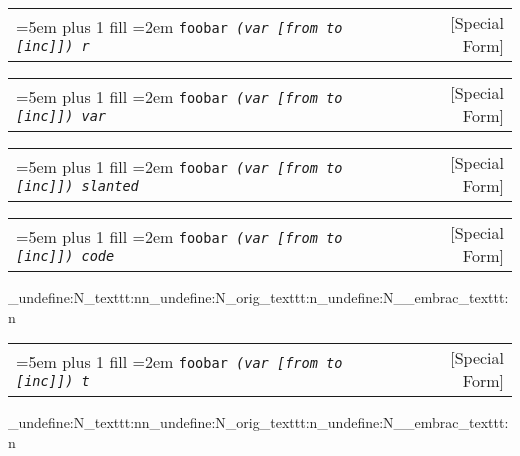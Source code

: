 \documentclass{book}
\newcommand\GNUTexinfocommandstyletextvar[1]{{\normalfont{}\textsl{#1}}}%
\begin{document}
%

\noindent\begin{tabularx}{\linewidth}{@{}Xr}
\rightskip=5em plus 1 fill
\hangindent=2em
\noindent\texttt{foobar \EmbracOn{}\textnormal{\textsl{(var \EmbracOff{}\textnormal{[}\EmbracOn{}from to \EmbracOff{}\textnormal{[}\EmbracOn{}inc\EmbracOff{}\textnormal{]]}\EmbracOn{}) r}}\EmbracOff{}}& [Special Form]
\end{tabularx}

%

\noindent\begin{tabularx}{\linewidth}{@{}Xr}
\rightskip=5em plus 1 fill
\hangindent=2em
\noindent\texttt{foobar \EmbracOn{}\textnormal{\textsl{(var \GNUTexinfocommandstyletextvar{[}from to \GNUTexinfocommandstyletextvar{[}inc\GNUTexinfocommandstyletextvar{]]}) var}}\EmbracOff{}}& [Special Form]
\end{tabularx}

%

\noindent\begin{tabularx}{\linewidth}{@{}Xr}
\rightskip=5em plus 1 fill
\hangindent=2em
\noindent\texttt{foobar \EmbracOn{}\textnormal{\textsl{(var \textsl{[}from to \textsl{[}inc\textsl{]]}) slanted}}\EmbracOff{}}& [Special Form]
\end{tabularx}

%

%
\noindent\begin{tabularx}{\linewidth}{@{}Xr}
\rightskip=5em plus 1 fill
\hangindent=2em
\noindent\texttt{foobar \EmbracOn{}\textnormal{\textsl{(var \texttt{[}from to \texttt{[}inc\texttt{]]}) code}}\EmbracOff{}}& [Special Form]
\end{tabularx}
\ExplSyntaxOn%
\cs_undefine:N{\embrac_texttt:nn}\cs_undefine:N{\embrac_orig_texttt:n}\cs_undefine:N{\__embrac_texttt:n}%
\ExplSyntaxOff%

%

%
\noindent\begin{tabularx}{\linewidth}{@{}Xr}
\rightskip=5em plus 1 fill
\hangindent=2em
\noindent\texttt{foobar \EmbracOn{}\textnormal{\textsl{(var \texttt{[}from to \texttt{[}inc\texttt{]]}) t}}\EmbracOff{}}& [Special Form]
\end{tabularx}
\ExplSyntaxOn%
\cs_undefine:N{\embrac_texttt:nn}\cs_undefine:N{\embrac_orig_texttt:n}\cs_undefine:N{\__embrac_texttt:n}%
\ExplSyntaxOff%
\end{document}
